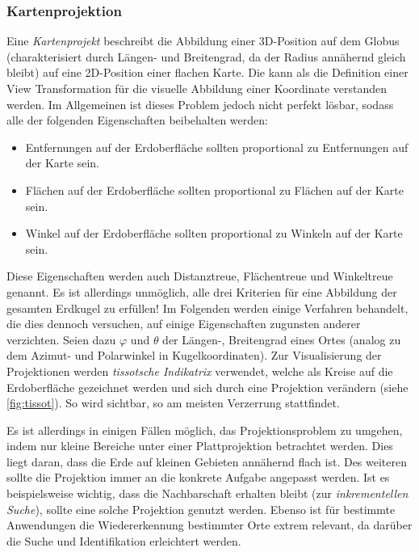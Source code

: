 			\subsubsection{Kartenprojektion}
				Eine \emph{Kartenprojekt} beschreibt die Abbildung einer 3D-Position auf dem Globus (charakterisiert durch Längen- und Breitengrad, da der Radius annähernd gleich bleibt) auf eine 2D-Position einer flachen Karte. Die kann als die Definition einer View Transformation für die visuelle Abbildung einer Koordinate verstanden werden. Im Allgemeinen ist dieses Problem jedoch nicht perfekt lösbar, sodass alle der folgenden Eigenschaften beibehalten werden:
				\begin{itemize}
					\item Entfernungen auf der Erdoberfläche sollten proportional zu Entfernungen auf der Karte sein.
					\item Flächen auf der Erdoberfläche sollten proportional zu Flächen auf der Karte sein.
					\item Winkel auf der Erdoberfläche sollten proportional zu Winkeln auf der Karte sein.
				\end{itemize}
				Diese Eigenschaften werden auch Distanztreue, Flächentreue und Winkeltreue genannt. Es ist allerdings unmöglich, alle drei Kriterien für eine Abbildung der gesamten Erdkugel zu erfüllen! Im Folgenden werden einige Verfahren behandelt, die dies dennoch versuchen, \bzw auf einige Eigenschaften zugunsten anderer verzichten. Seien dazu \(\varphi\) und \(\theta\) der Längen-, \bzw Breitengrad eines Ortes (analog zu dem Azimut- und Polarwinkel in Kugelkoordinaten). Zur Visualisierung der Projektionen werden \emph{tissotsche Indikatrix} verwendet, welche als Kreise auf die Erdoberfläche gezeichnet werden und sich durch eine Projektion verändern (siehe \autoref{fig:tissot}). So wird sichtbar, so am meisten Verzerrung stattfindet.

				Es ist allerdings in einigen Fällen möglich, das Projektionsproblem zu umgehen, indem nur kleine Bereiche unter einer Plattprojektion betrachtet werden. Dies liegt daran, dass die Erde auf kleinen Gebieten annähernd flach ist. Des weiteren sollte die Projektion immer an die konkrete Aufgabe angepasst werden. Ist es beispielsweise wichtig, dass die Nachbarschaft erhalten bleibt (zur \emph{inkrementellen Suche}), sollte eine solche Projektion genutzt werden. Ebenso ist für bestimmte Anwendungen die Wiedererkennung bestimmter Orte extrem relevant, da darüber die Suche und Identifikation erleichtert werden.

